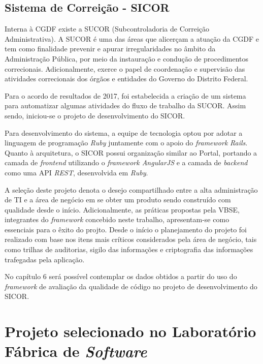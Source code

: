 \clearpage

\subsection{Sistema de Correição - SICOR}

Interna à CGDF existe a SUCOR (Subcontroladoria de Correição Administrativa). A SUCOR é uma das áreas que alicerçam a atuação da CGDF e tem como finalidade prevenir e apurar irregularidades no âmbito da Administração Pública, por meio da instauração e condução de procedimentos correcionais. Adicionalmente, exerce o papel de coordenação e supervisão das atividades correcionais dos órgãos e entidades do Governo do Distrito Federal.

Para o acordo de resultados de 2017, foi estabelecida a criação de um sistema para automatizar algumas atividades do fluxo de trabalho da SUCOR. Assim sendo, iniciou-se o projeto de desenvolvimento do SICOR.

Para desenvolvimento do sistema, a equipe de tecnologia optou por adotar a linguagem de programação \textit{Ruby} juntamente com o apoio do \textit{framework} \textit{Rails}. Quanto à arquitetura, o SICOR possui organização similar ao Portal, portando a camada de \textit{frontend} utilizando o \textit{framework AngularJS} e a camada de \textit{backend} como uma API \textit{REST}, desenvolvida em \textit{Ruby}.

A seleção deste projeto denota o desejo compartilhado entre a alta administração de TI e a área de negócio em se obter um produto sendo construído com qualidade desde o início. Adicionalmente, as práticas propostas pela VBSE, integrantes do \textit{framework} concebido neste trabalho, apresentam-se como essenciais para o êxito do projto. Desde o início o planejamento do projeto foi realizado com base nos itens mais críticos considerados pela área de negócio, tais como trilhas de auditorias, sigilo das informações e criptografia das informações trafegadas pela aplicação.

No capítulo 6 será possível contemplar os dados obtidos a partir do uso do \textit{framework} de avaliação da qualidade de código no projeto de desenvolvimento do SICOR.

\clearpage

\section{Projeto selecionado no Laboratório Fábrica de \textit{Software}}

